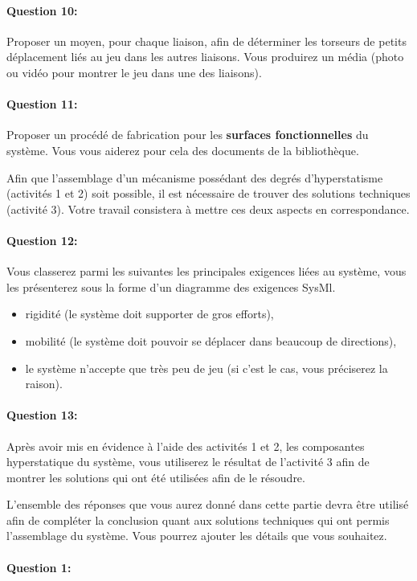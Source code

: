\paragraph{Question 10:} Proposer un moyen, pour chaque liaison, afin de déterminer les torseurs de petits déplacement liés au jeu dans les autres liaisons. Vous produirez un média (photo ou vidéo pour montrer le jeu dans une des liaisons).

\paragraph{Question 11:} Proposer un procédé de fabrication pour les \textbf{surfaces fonctionnelles} du système. Vous vous aiderez pour cela des documents de la bibliothèque.

\cleardoublepage


Afin que l'assemblage d'un mécanisme possédant des degrés d'hyperstatisme (activités 1 et 2) soit possible, il est nécessaire de trouver des solutions techniques (activité 3). Votre travail consistera à mettre ces deux aspects en correspondance.

\paragraph{Question 12:} Vous classerez parmi les suivantes les principales exigences liées au système, vous les présenterez sous la forme d'un diagramme des exigences SysMl.

\begin{itemize}
 \item rigidité (le système doit supporter de gros efforts),
 \item mobilité (le système doit pouvoir se déplacer dans beaucoup de directions),
 \item le système n'accepte que très peu de jeu (si c'est le cas, vous préciserez la raison).
\end{itemize}

\paragraph{Question 13:} Après avoir mis en évidence à l'aide des activités 1 et 2, les composantes hyperstatique du système, vous utiliserez le résultat de l'activité 3 afin de montrer les solutions qui ont été utilisées afin de le résoudre.

L'ensemble des réponses que vous aurez donné dans cette partie devra être utilisé afin de compléter la conclusion quant aux solutions techniques qui ont permis l'assemblage du système. Vous pourrez ajouter les détails que vous souhaitez.



\pagestyle{correction}\setcounter{section}{0}

\paragraph{Question 1:}

